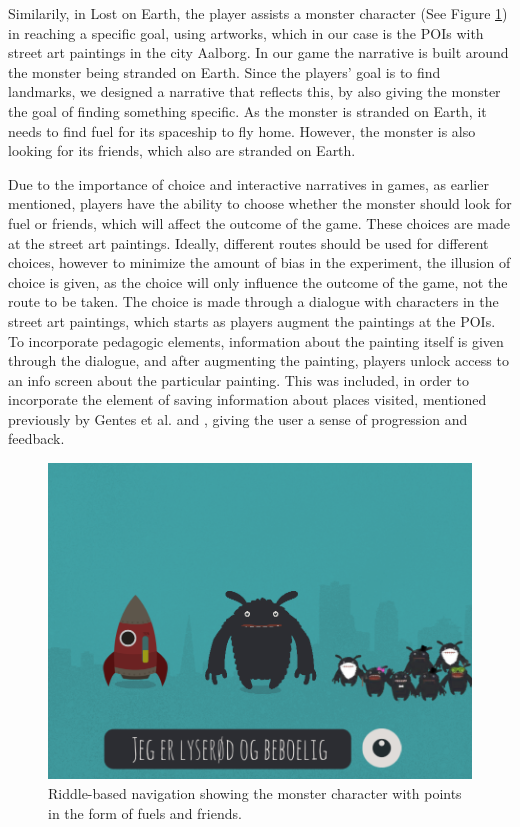 Similarily, in Lost on Earth, the player assists a monster character (See Figure \ref{monster}) in reaching a specific goal, using artworks, which in our case is the POIs with street art paintings in the city Aalborg. In our game the narrative is built around the monster being stranded on Earth. Since the players' goal is to find landmarks, we designed a narrative that reflects this, by also giving the monster the goal of finding something specific. As the monster is stranded on Earth, it needs to find fuel for its spaceship to fly home. However, the monster is also looking for its friends, which also are stranded on Earth.

Due to the importance of choice and interactive narratives in games, as earlier mentioned, players have the ability to choose whether the monster should look for fuel or friends, which will affect the outcome of the game. These choices are made at the street art paintings. Ideally, different routes should be used for different choices, however to minimize the amount of bias in the experiment, the illusion of choice is given, as the choice will only influence the outcome of the game, not the route to be taken. The choice is made through a dialogue with characters in the street art paintings, which starts as players augment the paintings at the POIs. To incorporate pedagogic elements, information about the painting itself is given through the dialogue, and after augmenting the painting, players unlock access to an info screen about the particular painting. This was included, in order to incorporate the element of saving information about places visited, mentioned previously by Gentes et al. \cite{GamingOnTheMove} and \cite{Insectopia}, giving the user a sense of progression and feedback. 

\begin{figure}[hbtp]
\centering
\includegraphics[scale=0.24]{Pics/riddles4.png}
\caption{Riddle-based navigation showing the monster character with points in the form of fuels and friends.}
\label{monster}
\end{figure}

